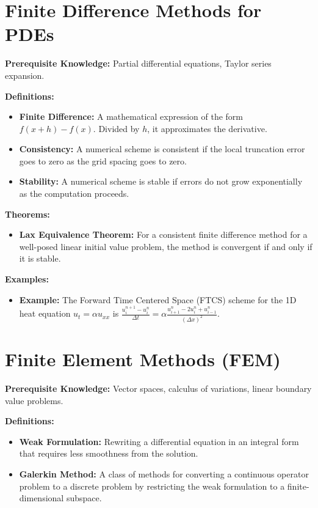 \section{Finite Difference Methods for PDEs}
\textbf{Prerequisite Knowledge:} Partial differential equations, Taylor series expansion.

\textbf{Definitions:}
\begin{itemize}
    \item \textbf{Finite Difference:} A mathematical expression of the form $f(x+h) - f(x)$. Divided by $h$, it approximates the derivative.
    \item \textbf{Consistency:} A numerical scheme is consistent if the local truncation error goes to zero as the grid spacing goes to zero.
    \item \textbf{Stability:} A numerical scheme is stable if errors do not grow exponentially as the computation proceeds.
\end{itemize}

\textbf{Theorems:}
\begin{itemize}
    \item \textbf{Lax Equivalence Theorem:} For a consistent finite difference method for a well-posed linear initial value problem, the method is convergent if and only if it is stable.
\end{itemize}

\textbf{Examples:}
\begin{itemize}
    \item \textbf{Example:} The Forward Time Centered Space (FTCS) scheme for the 1D heat equation $u_t = \alpha u_{xx}$ is $\frac{u_i^{n+1} - u_i^n}{\Delta t} = \alpha \frac{u_{i+1}^n - 2u_i^n + u_{i-1}^n}{(\Delta x)^2}$.
\end{itemize}


\section{Finite Element Methods (FEM)}
\textbf{Prerequisite Knowledge:} Vector spaces, calculus of variations, linear boundary value problems.

\textbf{Definitions:}
\begin{itemize}
    \item \textbf{Weak Formulation:} Rewriting a differential equation in an integral form that requires less smoothness from the solution.
    \item \textbf{Galerkin Method:} A class of methods for converting a continuous operator problem to a discrete problem by restricting the weak formulation to a finite-dimensional subspace.
\end{itemize}

